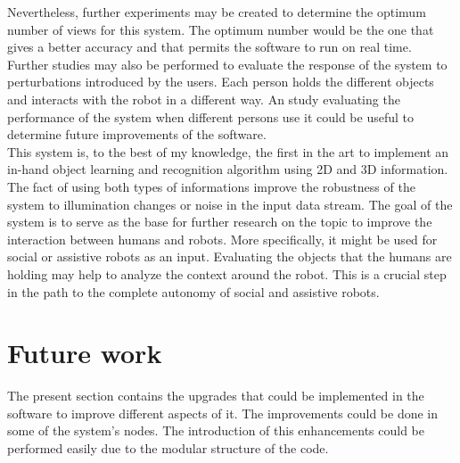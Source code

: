 	Nevertheless, further experiments may be created to determine the optimum number of views for this system. 
	The optimum number would be the one that gives a better accuracy and that permits the software to run on real time. 
	Further studies may also be performed to evaluate the response of the system to perturbations introduced by the users.
	Each person holds the different objects and interacts with the robot in a different way. 
	An study evaluating the performance of the system when different persons use it could be useful to determine future improvements of the software.  
	\\

	This system is, to the best of my knowledge, the first in the art to implement an in-hand object learning and recognition algorithm using 2D and 3D information.
	The fact of using both types of informations improve the robustness of the system to illumination changes or noise in the input data stream.  
	The goal of the system is to serve as the base for further research on the topic to improve the interaction between humans and robots. 
	More specifically, it might be used for social or assistive robots as an input. 
	Evaluating the objects that the humans are holding may help to analyze the context around the robot. 
	This is a crucial step in the path to the complete autonomy of social and assistive robots. 

	\section{Future work}

	The present section contains the upgrades that could be implemented in the software to improve different aspects of it. 
	The improvements could be done in some of the system's nodes.
	The introduction of this enhancements could be performed easily due to the modular structure of the code. 
	\\

